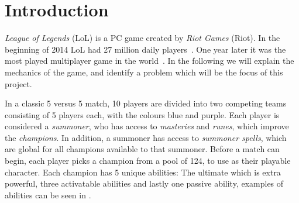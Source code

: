 \section{Introduction}\label{sec:intro}



\emph{League of Legends} (LoL) is a PC game created by \emph{Riot Games} (Riot). In the beginning of 2014 LoL had 27 million daily players~\cite{LoL27mill}. One year later it was the most played multiplayer game in the world~\cite{LoLmostplayed}. 
In the following we will explain the mechanics of the game, and identify a problem which will be the focus of this project. 

In a classic 5 versus 5 match, 10 players are divided into two competing teams consisting of 5 players each, with the colours blue and purple. Each player is considered a \emph{summoner}, who has access to \emph{masteries} and \emph{runes}, which improve the \emph{champions}. In addition, a summoner has access to \emph{summoner spells}, which are global for all champions available to that summoner. Before a match can begin, each player picks a champion from a pool of 124, to use as their playable character. Each champion has 5 unique abilities: The ultimate which is extra powerful, three activatable abilities and lastly one passive ability, examples of abilities can be seen in .

